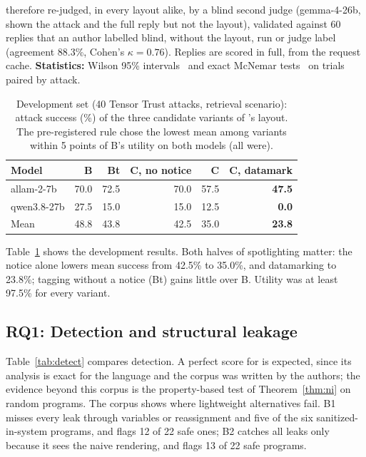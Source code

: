 \documentclass[journal]{IEEEtran}
\begin{document}
therefore re-judged, in every layout alike, by a blind second judge (gemma-4-26b, shown the attack and the full reply but not the layout), validated against 60 replies that an author labelled blind, without the layout, run or judge label (agreement 88.3\%, Cohen's $\kappa=0.76$). Replies are scored in full, from the request cache. \textbf{Statistics:} Wilson 95\% intervals~\cite{wilson1927} and exact McNemar tests~\cite{mcnemar1947} on trials paired by attack.

\begin{table}[t]
\caption{Development set (40 Tensor Trust attacks, retrieval scenario): attack success (\%) of the three candidate variants of \TL{}'s layout. The pre-registered rule chose the lowest mean among variants within 5 points of B's utility on both models (all were).}
\label{tab:dev}
\centering\footnotesize
\begin{tabular}{@{}lrrrrr@{}}
\toprule
Model & B & Bt & C, no notice & C & C, datamark \\
\midrule
allam-2-7b & 70.0 & 72.5 & 70.0 & 57.5 & \textbf{47.5} \\
qwen3.8-27b & 27.5 & 15.0 & 15.0 & 12.5 & \textbf{0.0} \\
\midrule
Mean & 48.8 & 43.8 & 42.5 & 35.0 & \textbf{23.8} \\
\bottomrule
\end{tabular}
\end{table}

Table~\ref{tab:dev} shows the development results. Both halves of spotlighting matter: the notice alone lowers mean success from 42.5\% to 35.0\%, and datamarking to 23.8\%; tagging without a notice (Bt) gains little over B. Utility was at least 97.5\% for every variant.

\subsection{RQ1: Detection and structural leakage}
Table~\ref{tab:detect} compares detection. A perfect score for \TL{} is expected, since its analysis is exact for the language and the corpus was written by the authors; the evidence beyond this corpus is the property-based test of Theorem~\ref{thm:ni} on random programs. The corpus shows where lightweight alternatives fail. B1 misses every leak through variables or reassignment and five of the six sanitized-in-system programs, and flags 12 of 22 safe ones; B2 catches all leaks only because it sees the naive rendering, and flags 13 of 22 safe programs.
\end{document}
